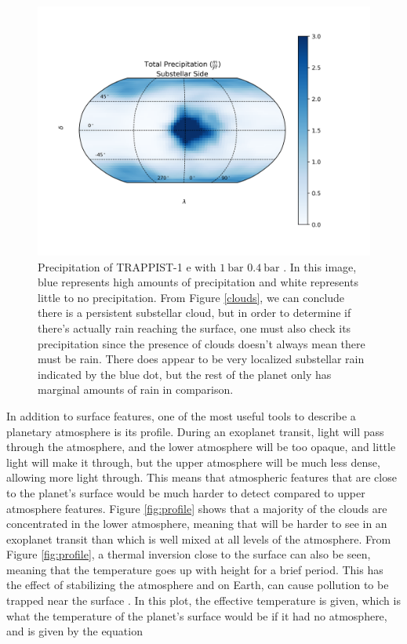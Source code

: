 \begin{figure}[htbp]
    \begin{center}
        \includegraphics[width=\textwidth]{models/precipitation_map.png}
        \caption[Precipitation of TRAPPIST-1 e]{Precipitation of TRAPPIST-1 e
        with $\SI{1}{\bar}$  $\SI{0.4}{\bar}$ . In this
        image, blue represents
        high amounts of precipitation and white represents little to no
        precipitation. From Figure \ref{clouds}, we can conclude there is a
        persistent substellar cloud, but in order to determine if there's
        actually rain reaching the surface, one must also check its
        precipitation since the presence of clouds doesn't always mean there
        must be rain. There does appear to be very localized substellar rain
        indicated by the blue dot, but the rest of the planet only has marginal
        amounts of rain in comparison.}
        \label{precip}
    \end{center}
\end{figure}

In addition to surface features, one of the most useful tools to describe a
 planetary atmosphere is its profile. During an exoplanet transit, light will
 pass through the atmosphere, and the lower atmosphere will be too opaque, and
 little light will make it through, but the upper atmosphere will be much less
 dense, allowing more light through. This means that atmospheric features that
 are close to the planet's surface would be much harder to detect
 compared to upper atmosphere features. Figure \ref{fig:profile} shows that
 a majority of the clouds are concentrated in the lower atmosphere, meaning that
  will be harder to see in an exoplanet transit than 
 which is well mixed at all levels of the atmosphere. From Figure
 \ref{fig:profile}, a thermal inversion close to the surface can also be seen,
 meaning that the temperature goes up with height for a brief period. This has
 the effect of stabilizing the atmosphere and on Earth, can cause pollution to
 be trapped near the surface \citep{inversion}. In this plot, the effective
 temperature is given, which is what the temperature of the planet's surface
 would be if it had no atmosphere, and is given by the equation

